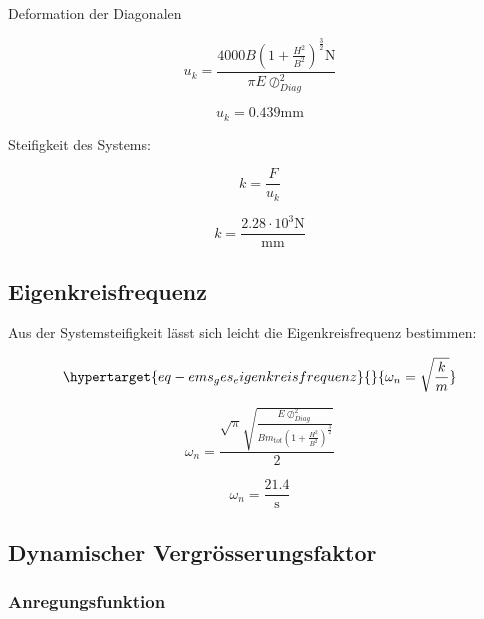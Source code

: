 \documentclass[
  letterpaper,
  DIV=11]{scrreprt}
\begin{document}
Deformation der Diagonalen

\begin{equation}u_{k} = \frac{4000 B \left(1 + \frac{H^{2}}{B^{2}}\right)^{\frac{3}{2}} \text{N}}{\pi E \oslash_{Diag}^{2}}\end{equation}

\begin{equation}u_{k} = 0.439 \text{mm}\end{equation}

Steifigkeit des Systems:

\begin{equation}k = \frac{F}{u_{k}}\end{equation}

\begin{equation}k = \frac{2.28 \cdot 10^{3} \text{N}}{\text{mm}}\end{equation}

\hypertarget{eigenkreisfrequenz-4}{%
\subsection{Eigenkreisfrequenz}\label{eigenkreisfrequenz-4}}

Aus der Systemsteifigkeit lässt sich leicht die Eigenkreisfrequenz
bestimmen:

\begin{equation}\protect\hypertarget{eq-ems_ges_eigenkreisfrequenz}{}{
\omega_n =\sqrt{\frac{k}{m}}
}\label{eq-ems_ges_eigenkreisfrequenz}\end{equation}

\begin{equation}\omega_{n} = \frac{\sqrt{\pi} \sqrt{\frac{E \oslash_{Diag}^{2}}{B m_{tot} \left(1 + \frac{H^{2}}{B^{2}}\right)^{\frac{3}{2}}}}}{2}\end{equation}

\begin{equation}\omega_{n} = \frac{21.4}{\text{s}}\end{equation}

\hypertarget{dynamischer-vergruxf6sserungsfaktor}{%
\subsection{Dynamischer
Vergrösserungsfaktor}\label{dynamischer-vergruxf6sserungsfaktor}}

\hypertarget{anregungsfunktion}{%
\subsubsection{Anregungsfunktion}\label{anregungsfunktion}}
\end{document}
